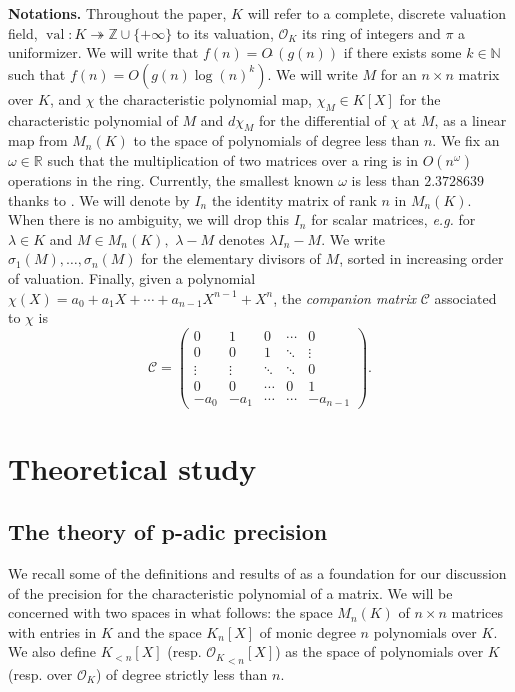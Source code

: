 \documentclass[sigconf]{acmart}
\DeclareMathOperator{\val}{val}
\newcommand{\Z}{\mathbb Z}
\newcommand{\R}{\mathbb R}
\newcommand{\OK}{\mathcal{O}_K}
\newcommand{\softO}{O\tilde{~}}
\theoremstyle{definition}
\begin{document}
\noindent
{\bf Notations.} 
Throughout the paper, $K$ will refer to a complete,
discrete valuation field, $\val : K \twoheadrightarrow \Z \cup \{+\infty\}$ to its valuation,
$\OK$ its ring of integers and $\pi$ a uniformizer. 
We will write that $f(n)=\softO (g(n))$ if there exists some
$k \in \mathbb{N}$ such that $f(n)=O(g(n) \log (n)^k).$
We will write $M$ for an $n \times n$ matrix over $K$,
and $\chi$ the characteristic polynomial map, $\chi_M \in K[X]$ for
the characteristic polynomial of $M$ and $d\chi_M$ for the differential
of $\chi$ at $M$, as a linear map from $M_n(K)$ to the space
of polynomials of degree less than $n$.
We fix an $\omega \in \R$ such that the multiplication
of two matrices over a ring is in $O(n^\omega)$ operations in the
ring. Currently, the smallest known $\omega$ is less than
$2.3728639 $ thanks to \cite{legall:14a}. 
We will denote by $I_n$ the identity matrix of rank $n$ in $M_n(K).$
When there is no ambiguity, we will drop this $I_n$
for scalar matrices, \textit{e.g.} for $\lambda \in K$
and $M \in M_n (K),$ $\lambda-M$ denotes $\lambda I_n - M.$
We write $\sigma_1(M), \dots, \sigma_n(M)$ for the
elementary divisors of $M$, sorted in increasing order of valuation.
Finally, given a polynomial $\chi(X) = a_0 + a_1 X + \cdots + a_{n-1} X^{n-1} + X^n$,
the \emph{companion matrix} $\mathscr{C}$ associated to $\chi$ is
\begin{equation}
\label{eq:companion}
\mathscr{C} = \left( \begin{matrix}
0 & 1 & 0 & \cdots & 0 \\
0 & 0 & 1 & \ddots & \vdots \\
\vdots & \vdots & \ddots & \ddots & 0 \\
0 & 0 & \cdots & 0 & 1 \\
-a_0 & -a_1 & \cdots & \cdots & -a_{n-1}
\end{matrix} \right).
\end{equation}

\section{Theoretical study}
\label{sec:theo_study}

\subsection{The theory of p-adic precision} \label{sec:padicprec}

We recall some of the definitions and results of \cite{caruso-roe-vaccon:14a}
as a foundation for our discussion of the precision for the characteristic polynomial
of a matrix.  We will be concerned with two spaces in what follows:
the space $M_n(K)$ of $n \times n$ matrices with entries in $K$ and the space
$K_n[X]$ of monic degree $n$ polynomials over $K$.  We also define $K_{<n}[X]$ (resp. 
${\OK}_{<n}[X]$) as the space of polynomials over $K$ (resp. over $\OK$) 
of degree strictly less than $n$.
\end{document}
